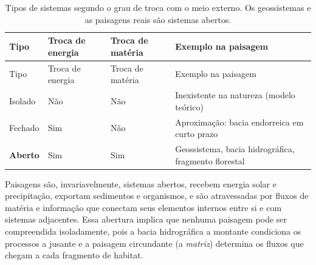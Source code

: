 \documentclass[
  portuguese,
  11pt,
  a4paper,
  open=any]{scrbook}
\begin{document}
\begin{longtable}[]{@{}
  >{\raggedright\arraybackslash}p{}
  >{\centering\arraybackslash}p{}
  >{\centering\arraybackslash}p{}
  >{\raggedright\arraybackslash}p{}@{}}
\caption{Tipos de sistemas segundo o grau de troca com o meio externo.
Os geossistemas e as paisagens reais são sistemas
abertos.}\label{tbl-tipos-sistemas}\tabularnewline
\toprule\noalign{}
\begin{minipage}[b]{\linewidth}\raggedright
Tipo
\end{minipage} & \begin{minipage}[b]{\linewidth}\centering
Troca de energia
\end{minipage} & \begin{minipage}[b]{\linewidth}\centering
Troca de matéria
\end{minipage} & \begin{minipage}[b]{\linewidth}\raggedright
Exemplo na paisagem
\end{minipage} \\
\midrule\noalign{}
\endfirsthead
\toprule\noalign{}
\begin{minipage}[b]{\linewidth}\raggedright
Tipo
\end{minipage} & \begin{minipage}[b]{\linewidth}\centering
Troca de energia
\end{minipage} & \begin{minipage}[b]{\linewidth}\centering
Troca de matéria
\end{minipage} & \begin{minipage}[b]{\linewidth}\raggedright
Exemplo na paisagem
\end{minipage} \\
\midrule\noalign{}
\endhead
\bottomrule\noalign{}
\endlastfoot
Isolado & Não & Não & Inexistente na natureza (modelo teórico) \\
Fechado & Sim & Não & Aproximação: bacia endorreica em curto prazo \\
\textbf{Aberto} & Sim & Sim & Geossistema, bacia hidrográfica, fragmento
florestal \\
\end{longtable}

Paisagens são, invariavelmente, sistemas abertos, recebem energia solar
e precipitação, exportam sedimentos e organismos, e são atravessadas por
fluxos de matéria e informação que conectam seus elementos internos
entre si e com sistemas adjacentes. Essa abertura implica que nenhuma
paisagem pode ser compreendida isoladamente, pois a bacia hidrográfica a
montante condiciona os processos a jusante e a paisagem circundante (a
\emph{matriz}) determina os fluxos que chegam a cada fragmento de
habitat.
\end{document}
